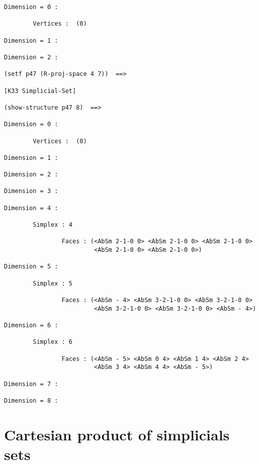 {{\begin{verbatim}
Dimension = 0 :

        Vertices :  (0)

Dimension = 1 :

Dimension = 2 :

(setf p47 (R-proj-space 4 7))  ==>

[K33 Simplicial-Set]

(show-structure p47 8)  ==>

Dimension = 0 :

        Vertices :  (0)

Dimension = 1 :

Dimension = 2 :

Dimension = 3 :

Dimension = 4 :

        Simplex : 4

                Faces : (<AbSm 2-1-0 0> <AbSm 2-1-0 0> <AbSm 2-1-0 0>
                         <AbSm 2-1-0 0> <AbSm 2-1-0 0>)

Dimension = 5 :

        Simplex : 5

                Faces : (<AbSm - 4> <AbSm 3-2-1-0 0> <AbSm 3-2-1-0 0>
                         <AbSm 3-2-1-0 0> <AbSm 3-2-1-0 0> <AbSm - 4>)

Dimension = 6 :

        Simplex : 6

                Faces : (<AbSm - 5> <AbSm 0 4> <AbSm 1 4> <AbSm 2 4>
                         <AbSm 3 4> <AbSm 4 4> <AbSm - 5>)

Dimension = 7 :

Dimension = 8 :
\end{verbatim}}

\newpage

\section {Cartesian product of  simplicials sets }

}
